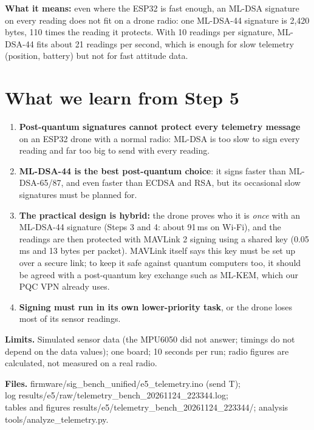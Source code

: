 \documentclass[10pt,a4paper]{article}
\begin{document}
\textbf{What it means:} even where the ESP32 is fast enough, an ML-DSA signature on every reading
does not fit on a drone radio: one ML-DSA-44 signature is 2,420 bytes, 110 times the reading it protects.
With 10 readings per signature, ML-DSA-44 fits about 21 readings per second, which is enough for slow
telemetry (position, battery) but not for fast attitude data.

\section{What we learn from Step 5}

\begin{enumerate}[nosep]
  \item \textbf{Post-quantum signatures cannot protect every telemetry message} on an ESP32 drone with a
        normal radio: ML-DSA is too slow to sign every reading and far too big to send with every
        reading.
  \item \textbf{ML-DSA-44 is the best post-quantum choice}: it signs faster than ML-DSA-65/87, and even
        faster than ECDSA and RSA, but its occasional slow signatures must be planned for.
  \item \textbf{The practical design is hybrid:} the drone proves who it is \emph{once} with an ML-DSA-44
        signature (Steps 3 and 4: about 91\,ms on Wi-Fi), and the readings are then protected with
        MAVLink 2 signing using a shared key (0.05\,ms and 13 bytes per packet). MAVLink itself says
        this key must be set up over a secure link; to keep it safe against quantum computers too, it
        should be agreed with a post-quantum key exchange such as ML-KEM, which our PQC VPN already uses.
  \item \textbf{Signing must run in its own lower-priority task}, or the drone loses most of its sensor
        readings.
\end{enumerate}

\textbf{Limits.} Simulated sensor data (the MPU6050 did not answer; timings do not depend on the data
values); one board; 10 seconds per run; radio figures are calculated, not measured on a real radio.

\textbf{Files.} {\small\ttfamily firmware/sig\_bench\_unified/e5\_telemetry.ino} (send T);\\
log {\small\ttfamily results/e5/raw/telemetry\_bench\_20261124\_223344.log};\\
tables and figures {\small\ttfamily results/e5/telemetry\_bench\_20261124\_223344/}; analysis
{\small\ttfamily tools/analyze\_telemetry.py}.
\end{document}
